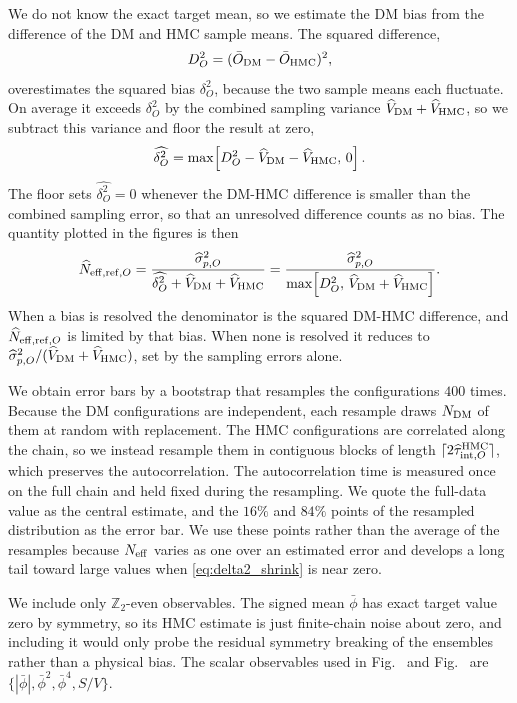 \documentclass[reprint,twocolumn,superscriptaddress,preprintnumbers,amsmath,amssymb,aps,prd,floatfix]{revtex4-2}
\def\eq#1{\eqref{#1}}
\def\fig#1{Fig.~\labelcref{#1}} \def\Fig#1{Fig.~\labelcref{#1}} \def\figs#1#2{Figs.~\labelcref{#1} and \labelcref{#2}} \def\Figs#1#2{Figs.~\labelcref{#1} and \labelcref{#2}} \def\Tab#1{Tab.~\labelcref{#1}} \def\tab#1{Tab.~\labelcref{#1}} \def\Sec#1{Sec.~\labelcref{#1}}
\begin{document}
We do not know the exact target mean, so we estimate the DM bias from the difference of the DM and HMC sample means. The squared difference,
\begin{equation}
D_O^2=(\bar O_{\rm DM}-\bar O_{\rm HMC})^2,
\end{equation}
overestimates the squared bias $\delta_O^2$, because the two sample means each fluctuate. On average it exceeds $\delta_O^2$ by the combined sampling variance $\widehat V_{\rm DM}+\widehat V_{\rm HMC}$, so we subtract this variance and floor the result at zero,
\begin{equation}
\widehat{\delta_O^2}=\max\!\left[D_O^2-\widehat V_{\rm DM}-\widehat V_{\rm HMC},\,0\right] .
\label{eq:delta2_shrink}
\end{equation}
The floor sets $\widehat{\delta_O^2}=0$ whenever the DM-HMC difference is smaller than the combined sampling error, so that an unresolved difference counts as no bias. The quantity plotted in the figures is then
\begin{equation}
\widehat N_{{\rm eff,ref},O}=\frac{\widehat\sigma_{p,O}^2}{\widehat{\delta_O^2}+\widehat V_{\rm DM}+\widehat V_{\rm HMC}}=\frac{\widehat\sigma_{p,O}^2}{\max\!\left[D_O^2,\,\widehat V_{\rm DM}+\widehat V_{\rm HMC}\right]} .
\label{eq:neff_ref_app}
\end{equation}
When a bias is resolved the denominator is the squared DM-HMC difference, and $\widehat N_{{\rm eff,ref},O}$ is limited by that bias. When none is resolved it reduces to $\widehat\sigma_{p,O}^2/(\widehat V_{\rm DM}+\widehat V_{\rm HMC})$, set by the sampling errors alone.

We obtain error bars by a bootstrap that resamples the configurations $400$ times. Because the DM configurations are independent, each resample draws $N_{\rm DM}$ of them at random with replacement. The HMC configurations are correlated along the chain, so we instead resample them in contiguous blocks of length $\lceil 2\widehat\tau_{{\rm int},O}^{\rm HMC}\rceil$, which preserves the autocorrelation. The autocorrelation time is measured once on the full chain and held fixed during the resampling. We quote the full-data value as the central estimate, and the $16\%$ and $84\%$ points of the resampled distribution as the error bar. We use these points rather than the average of the resamples because $N_{\rm eff}$ varies as one over an estimated error and develops a long tail toward large values when \eq{eq:delta2_shrink} is near zero.

We include only $\mathbb{Z}_2$-even observables. The signed mean $\bar\phi$ has exact target value zero by symmetry, so its HMC estimate is just finite-chain noise about zero, and including it would only probe the residual symmetry breaking of the ensembles rather than a physical bias. The scalar observables used in \fig{fig:ess_mse_2d} and \fig{fig:ess_mse_3d} are $\{|\bar\phi|,\bar\phi^2,\bar\phi^4,S/V\}$.
\end{document}
